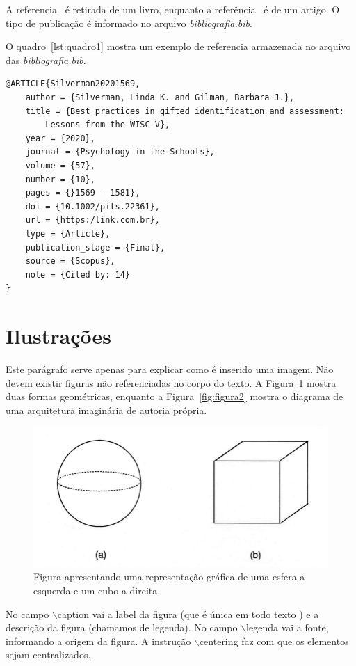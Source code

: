 A referencia~\cite{ericson2004real} é retirada de um livro, enquanto a referência~\cite{Silverman20201569} é de um artigo. O tipo de publicação é informado no arquivo \emph{bibliografia.bib}. 

O quadro~\ref{lst:quadro1} mostra um exemplo de referencia armazenada no arquivo das \emph{bibliografia.bib}.

\begin{lstlisting}[caption={Exemplo referência},label={lst:quadro1}]
@ARTICLE{Silverman20201569,
	author = {Silverman, Linda K. and Gilman, Barbara J.},
	title = {Best practices in gifted identification and assessment: 
		Lessons from the WISC-V},
	year = {2020},
	journal = {Psychology in the Schools},
	volume = {57},
	number = {10},
	pages = {}1569 - 1581},
	doi = {10.1002/pits.22361},
	url = {https:/link.com.br},
	type = {Article},
	publication_stage = {Final},
	source = {Scopus},
	note = {Cited by: 14}
}
\end{lstlisting}
	

\section{\label{sec:ilustrações}Ilustrações}
Este parágrafo serve apenas para explicar como é inserido uma imagem. Não devem existir figuras não referenciadas no corpo do texto. A Figura~\ref{fig:figura1} mostra duas formas geométricas, enquanto a Figura~\ref{fig:figura2} mostra o diagrama de uma arquitetura imaginária de autoria própria.

\begin{figure}[htb]
	\centering
	\caption{\label{fig:figura1} Figura apresentando uma representação gráfica de uma esfera a esquerda e um cubo a direita.}
	\includegraphics[width=\textwidth]{imgs/figura1.png}
\end{figure}

No campo $\backslash$caption vai a label da figura (que é única em todo texto ) e a descrição da figura (chamamos de legenda). No campo $\backslash$legenda vai a fonte, informando a origem da figura. A instrução $\backslash$centering faz com que os elementos sejam centralizados.


